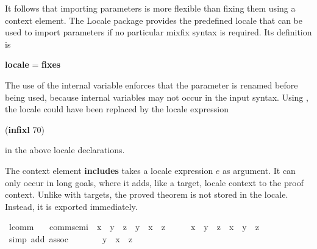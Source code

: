\begin{isabellebody}
\begin{isamarkuptext}
  It follows that importing
  parameters is more flexible than fixing them using a context element.
  The Locale package provides the predefined locale  that
  can be used to import parameters if no
  particular mixfix syntax is required.
  Its definition is
\begin{center}
  \textbf{locale}  = \textbf{fixes} 
\end{center}
  The use of the internal variable 
  enforces that the parameter is renamed before being used, because
  internal variables may not occur in the input syntax.  Using
  , the locale  could have been replaced by
  the locale expression
\begin{center}
    (\textbf{infixl} \isa{{\isachardoublequote}{\isasymcdot}{\isachardoublequote}} 70)
\end{center}
  in the above locale declarations.%
\end{isamarkuptext}%
\isamarkuptrue%
%
\isamarkuptrue%
%
\begin{isamarkuptext}%
\label{sec-includes}
  The context element \textbf{includes} takes a locale expression $e$
  as argument.  It can only occur in long goals, where it
  adds, like a target, locale context to the proof context.  Unlike
  with targets, the proved theorem is not stored
  in the locale.  Instead, it is exported immediately.%
\end{isamarkuptext}%
\isamarkuptrue%
\isamarkupfalse%
\ lcomm{}{\isacharcolon}\isanewline
\ \ \ comm{\isacharunderscore}semi\ \ {\isachardoublequoteopen}x\ {\isasymcdot}\ {\isacharparenleft}y\ {\isasymcdot}\ z{\isacharparenright}\ {\isacharequal}\ y\ {\isasymcdot}\ {\isacharparenleft}x\ {\isasymcdot}\ z{\isacharparenright}{\isachardoublequoteclose}\isanewline
%
\isadelimproof
%
\endisadelimproof
%
\isatagproof
{}\isamarkupfalse%
\ {\isacharminus}\isanewline
\ \ \isamarkupfalse%
\ {\isachardoublequoteopen}x\ {\isasymcdot}\ {\isacharparenleft}y\ {\isasymcdot}\ z{\isacharparenright}\ {\isacharequal}\ {\isacharparenleft}x\ {\isasymcdot}\ y{\isacharparenright}\ {\isasymcdot}\ z{\isachardoublequoteclose}\ \isamarkupfalse%
\ {\isacharparenleft}simp\ add{\isacharcolon}\ assoc{\isacharparenright}\isanewline
\ \ \isamarkupfalse%
\ \isamarkupfalse%
\ {\isachardoublequoteopen}{\isasymdots}\ {\isacharequal}\ {\isacharparenleft}y\ {\isasymcdot}\ x{\isacharparenright}\ {\isasymcdot}\ z{\isachardoublequoteclose}\ \isamarkupfalse%

\end{isabellebody}

